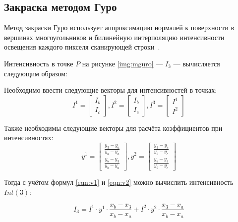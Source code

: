  \pagebreak

\subsection{Закраска методом Гуро}

Метод закраски Гуро использует аппроксимацию нормалей к поверхности в вершинах многоугольников и билинейную интерполяцию интенсивности освещения каждого пикселя сканирующей строки~\cite{light}. 

Интенсивность в точке $P$ на рисунке \ref{img:mguro} --- $I_3$ --- вычисляется следующим образом:


 
Необходимо ввести следующие векторы для интенсивностей в точках:
\begin{equation}
	\label{eqn:v1} 
	I^1 = 
	\begin{bmatrix}
		I_b \\
		I_c
	\end{bmatrix},
	I^2 = \begin{bmatrix}
		I_b \\
		I_c
	\end{bmatrix},
	I^3 = \begin{bmatrix}
		I^1\\
		I^2
	\end{bmatrix}
\end{equation}

Также необходимы следующие векторы для расчёта коэффициентов при интенсивностях:
\begin{equation}
	\label{eqn:v2}
	y^1 = \begin{bmatrix}
		\frac{y_3-y_a}{y_b-y_a}\\
		\frac{y_b-y_3}{y_b-y_a}
	\end{bmatrix},
	y^2 = \begin{bmatrix}
		\frac{y_3-y_c}{y_b-y_c}\\
		\frac{y_b-y_3}{y_b-y_c}
	\end{bmatrix}
\end{equation}

Тогда с учётом формул \ref{eqn:v1} и \ref{eqn:v2} можно вычислить интенсивность $Int(3)$:

\begin{equation}
	I_3 = I^1\cdot y^1 \cdot \frac{x_b-x_3}{x_b-x_a} + I^2\cdot y^2 \cdot \frac{x_3-x_a}{x_b-x_a}
\end{equation}

